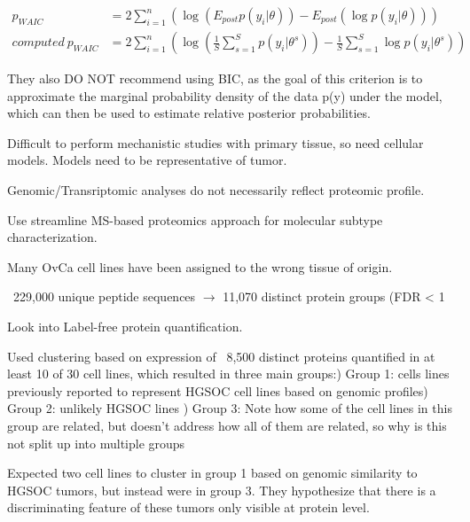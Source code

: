 \documentclass[11pt]{labbook}
\begin{document}
\begin{align*}
p_{WAIC} &= 2 \sum_{i=1}^n\left(\log{(E_{post}p(y_i|\theta))} - E_{post}(\log{p(y_i|\theta)})\right) \\
computed\ p_{WAIC} &= 2 \sum_{i=1}^n\left(\log{\left(\frac{1}{S} \sum_{s=1}^S p(y_i|\theta^s)\right)} - \frac{1}{S}\sum_{s=1}^S\log{p(y_i|\theta^s)}\right)
\end{align*}

They also DO NOT recommend using BIC, as the goal of this criterion is to approximate the marginal probability density of the data p(y) under the model, which can then be used to estimate relative posterior probabilities. 






Difficult to perform mechanistic studies with primary tissue, so need cellular models. Models need to be representative of tumor. 

Genomic/Transriptomic analyses do not necessarily reflect proteomic profile. 

Use streamline MS-based proteomics approach for molecular subtype characterization.

Many OvCa cell lines have been assigned to the wrong tissue of origin. 


~229,000 unique peptide sequences $\rightarrow$ 11,070 distinct protein groups (FDR < 1%

Look into Label-free protein quantification. 

Used clustering based on expression of ~8,500 distinct proteins quantified in at least 10 of 30 cell lines, which resulted in three main groups:) Group 1: cells lines previously reported to represent HGSOC cell lines based on genomic profiles) Group 2: unlikely HGSOC lines ) Group 3: Note how some of the cell lines in this group are related, but doesn't address how all of them are related, so why is this not split up into multiple groups
 
Expected two cell lines to cluster in group 1 based on genomic similarity to HGSOC tumors, but instead were in group 3. They hypothesize that there is a discriminating feature of these tumors only visible at protein level.
\end{document}
